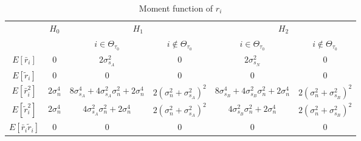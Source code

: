 \begin{table}[h]
\centering
  \begin{tabular}{|c|c|c|c|c|c|}
	\hline
	\multirow{2}{*}{}           & \multirow{2}{*}{$H_0$} & \multicolumn{2}{c|}{$H_1$}                                                               & \multicolumn{2}{c|}{$H_2$}                                                               \\ \cline{3-6} 
	&                        & $i \in \Theta_{\tau_0}$                                                   & $i\notin \Theta_{\tau_0}$                          & $i\in \Theta_{\tau_0}$                                                   & $i\notin \Theta_{\tau_0}$                          \\ \hline
	$E[\bar{r}_i]$              & $0$                    & $2\sigma_{s_A}^2$                                       & $0$                            & $2\sigma_{s_N}^2$                                                         & $0$                            \\ \hline
	$E[\tilde{r}_i]$            & $0$                    & $0$                                                     & $0$                            & $0$                                                     & $0$                            \\ \hline
	$E[\bar{r}_i^2]$            & $2\sigma_n^4$          & $8\sigma_{s_A}^4+4\sigma_{s_A}^2\sigma_n^2+2\sigma_n^4$ & $2(\sigma_n^2+\sigma_{s_A}^2)^2$ & $8\sigma_{s_B}^4+4\sigma_{s_B}^2\sigma_n^2+2\sigma_n^4$ & $2(\sigma_n^2+\sigma_{s_B}^2)^2$ \\ \hline
	$E[\tilde{r}_i^2]$          & $2\sigma_n^4$          & $4\sigma_{s_A}^2\sigma_n^2+2\sigma_n^4$                 & $2(\sigma_n^2+\sigma_{s_A}^2)^2$ & $4\sigma_{s_B}^2\sigma_n^2+2\sigma_n^4$                 & $2(\sigma_n^2+\sigma_{s_B}^2)^2$ \\ \hline
	$E[\bar{r}_i\tilde{r}_i]$   & $0$                    & $0$                                                     & $0$                            & $0$                                                     & $0$                            \\ \hline
  \end{tabular}
  \caption{Moment function of $r_i$}
  \label{Table1}
\end{table}

